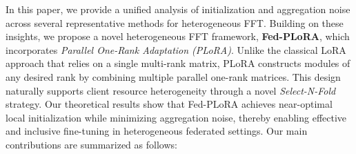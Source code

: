 \documentclass{article} %
\begin{document}
In this paper, we provide a unified analysis of initialization and aggregation noise across several representative methods for heterogeneous FFT. Building on these insights, we propose a novel heterogeneous FFT framework, \textbf{Fed-PLoRA}, which incorporates \textit{Parallel One-Rank Adaptation (PLoRA)}. Unlike the classical LoRA approach that relies on a single multi-rank matrix, PLoRA constructs modules of any desired rank by combining multiple parallel one-rank matrices. This design naturally supports client resource heterogeneity through a novel \textit{Select-N-Fold} strategy. Our theoretical results show that Fed-PLoRA achieves near-optimal local initialization while minimizing aggregation noise, thereby enabling effective and inclusive fine-tuning in heterogeneous federated settings. 
% 
%
Our main contributions are summarized as follows: 
\end{document}
